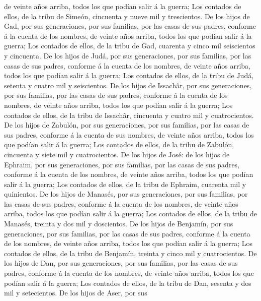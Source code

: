 de veinte años arriba, todos los que podían salir á la guerra;
 Los contados de ellos, de la tribu de Simeón, cincuenta y
nueve mil y trescientos.  De los hijos de Gad, por sus
generaciones, por sus familias, por las casas de sus padres, conforme á
la cuenta de los nombres, de veinte años arriba, todos los que podían
salir á la guerra;  Los contados de ellos, de la tribu de
Gad, cuarenta y cinco mil seiscientos y cincuenta.  De los
hijos de Judá, por sus generaciones, por sus familias, por las casas de
sus padres, conforme á la cuenta de los nombres, de veinte años arriba,
todos los que podían salir á la guerra;  Los contados de
ellos, de la tribu de Judá, setenta y cuatro mil y seiscientos.
 De los hijos de Issachâr, por sus generaciones, por sus
familias, por las casas de sus padres, conforme á la cuenta de los
nombres, de veinte años arriba, todos los que podían salir á la guerra;
 Los contados de ellos, de la tribu de Issachâr, cincuenta
y cuatro mil y cuatrocientos.  De los hijos de Zabulón, por
sus generaciones, por sus familias, por las casas de sus padres,
conforme á la cuenta de sus nombres, de veinte años arriba, todos los
que podían salir á la guerra;  Los contados de ellos, de la
tribu de Zabulón, cincuenta y siete mil y cuatrocientos. 
De los hijos de José: de los hijos de Ephraim, por sus generaciones, por
sus familias, por las casas de sus padres, conforme á la cuenta de los
nombres, de veinte años arriba, todos los que podían salir á la guerra;
 Los contados de ellos, de la tribu de Ephraim, cuarenta
mil y quinientos.  De los hijos de Manasés, por sus
generaciones, por sus familias, por las casas de sus padres, conforme á
la cuenta de los nombres, de veinte años arriba, todos los que podían
salir á la guerra;  Los contados de ellos, de la tribu de
Manasés, treinta y dos mil y doscientos.  De los hijos de
Benjamín, por sus generaciones, por sus familias, por las casas de sus
padres, conforme á la cuenta de los nombres, de veinte años arriba,
todos los que podían salir á la guerra;  Los contados de
ellos, de la tribu de Benjamín, treinta y cinco mil y cuatrocientos.
 De los hijos de Dan, por sus generaciones, por sus
familias, por las casas de sus padres, conforme á la cuenta de los
nombres, de veinte años arriba, todos los que podían salir á la guerra;
 Los contados de ellos, de la tribu de Dan, sesenta y dos
mil y setecientos.  De los hijos de Aser, por sus
